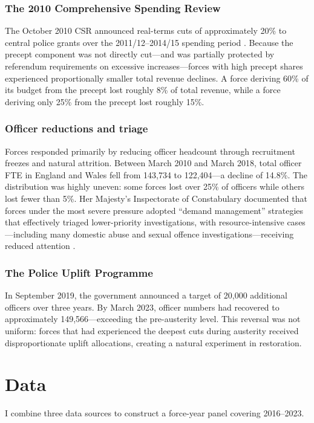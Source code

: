 \documentclass[12pt]{article}
\begin{document}
\subsubsection*{The 2010 Comprehensive Spending Review}  The October 2010 CSR announced real-terms cuts of approximately 20\% to central police grants over the 2011/12--2014/15 spending period \citep{hmtreasury2010}. Because the precept component was not directly cut---and was partially protected by referendum requirements on excessive increases---forces with high precept shares experienced proportionally smaller total revenue declines. A force deriving 60\% of its budget from the precept lost roughly 8\% of total revenue, while a force deriving only 25\% from the precept lost roughly 15\%.

\subsubsection*{Officer reductions and triage}  Forces responded primarily by reducing officer headcount through recruitment freezes and natural attrition. Between March 2010 and March 2018, total officer FTE in England and Wales fell from 143,734 to 122,404---a decline of 14.8\%. The distribution was highly uneven: some forces lost over 25\% of officers while others lost fewer than 5\%. Her Majesty's Inspectorate of Constabulary documented that forces under the most severe pressure adopted ``demand management'' strategies that effectively triaged lower-priority investigations, with resource-intensive cases---including many domestic abuse and sexual offence investigations---receiving reduced attention \citep{hmicfrs2019}.

\subsubsection*{The Police Uplift Programme}  In September 2019, the government announced a target of 20,000 additional officers over three years. By March 2023, officer numbers had recovered to approximately 149,566---exceeding the pre-austerity level. This reversal was not uniform: forces that had experienced the deepest cuts during austerity received disproportionate uplift allocations, creating a natural experiment in restoration.

\section{Data}

I combine three data sources to construct a force-year panel covering 2016--2023.
\end{document}
